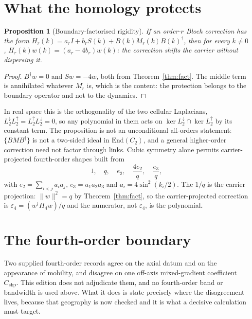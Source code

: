 \documentclass[11pt]{article}
\theoremstyle{plain}
\newtheorem{proposition}[theorem]{Proposition}
\theoremstyle{definition}
\theoremstyle{remark}
\newcommand{\chk}[1]{}
\newcommand{\dg}{^{\dagger}}
\begin{document}
\section{What the homology protects}

\begin{proposition}[Boundary-factorised rigidity]\label{prop:rigid}
If an order-$r$ Bloch correction has the form
$H_r(k)=a_rI+b_rS(k)+B(k)M_r(k)B(k)\dg$, then for every $k\neq0$,
$H_r(k)w(k)=(a_r-4b_r)w(k)$: the correction shifts the carrier without
dispersing it.
\end{proposition}

\begin{proof}
$B\dg w=0$ and $Sw=-4w$, both from Theorem~\ref{thm:fact}. The middle term is
annihilated whatever $M_r$ is, which is the content: the protection belongs to
the boundary operator and not to the dynamics.
\end{proof}
\chk{a boundary-factorised correction shifts the carrier without dispersing it, for generic M}

In real space this is the orthogonality of the two cellular Laplacians,
$L^{\downarrow}_2L^{\uparrow}_2=L^{\uparrow}_2L^{\downarrow}_2=0$, so any
polynomial in them acts on $\ker L^{\downarrow}_2\cap\ker L^{\uparrow}_2$ by
its constant term. The proposition is not an unconditional all-orders
statement: $\{BMB\dg\}$ is not a two-sided ideal in $\mathrm{End}(C_2)$, and a
general higher-order correction need not factor through links. Cubic symmetry
alone permits carrier-projected fourth-order shapes built from
\begin{equation}\label{eq:shapes}
  1,\quad q,\quad e_2,\quad \frac{4e_2}{q},\quad \frac{e_3}{q},
\end{equation}
with $e_2=\sum_{i<j}a_ia_j$, $e_3=a_1a_2a_3$ and $a_i=4\sin^2(k_i/2)$. The
$1/q$ is the carrier projection: $\|w\|^2=q$ by Theorem~\ref{thm:fact}, so the
carrier-projected correction is $\varepsilon_4=(w\dg H_4w)/q$ and the
numerator, not $\varepsilon_4$, is the polynomial.
\chk{the carrier projection is where the 1/q comes from}
\chk{clearing the denominator reproduces the five-element numerator basis}

\section{The fourth-order boundary}
\label{sec:fourth}

Two supplied fourth-order records agree on the axial datum and on the
appearance of mobility, and disagree on one off-axis mixed-gradient
coefficient $C_{\mathrm{shp}}$. This edition does not adjudicate them, and no
fourth-order band or bandwidth is used above. What it does is state precisely
where the disagreement lives, because that geography is now checked and it is
what a decisive calculation must target.
\end{document}
